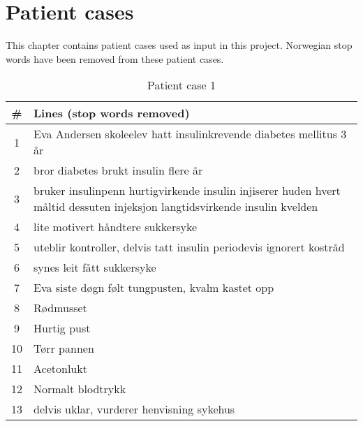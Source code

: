 \chapter{Patient cases}
This chapter contains patient cases used as input in this project.
Norwegian stop words have been removed from these patient cases.
\begin{table}[htbp] \footnotesize \center
\caption{Patient case 1\label{tab:pcase1}}
\begin{tabularx}{\textwidth}{c X}
    \toprule
    \# & Lines (stop words removed) \\
    \midrule
	1 & Eva Andersen skoleelev hatt insulinkrevende diabetes mellitus 3 år \\
	2 & bror diabetes brukt insulin flere år \\
	3 & bruker insulinpenn hurtigvirkende insulin injiserer huden hvert måltid dessuten injeksjon langtidsvirkende insulin kvelden \\
	4 & lite motivert håndtere sukkersyke \\
	5 & uteblir kontroller, delvis tatt insulin periodevis ignorert kostråd \\
	6 & synes leit fått sukkersyke \\
	7 & Eva siste døgn følt tungpusten, kvalm kastet opp \\
	8 & Rødmusset \\
	9 & Hurtig pust \\
	10 & Tørr pannen \\
	11 & Acetonlukt \\
	12 & Normalt blodtrykk \\
	13 & delvis uklar, vurderer henvisning sykehus \\
	\bottomrule
\end{tabularx}
\end{table}


